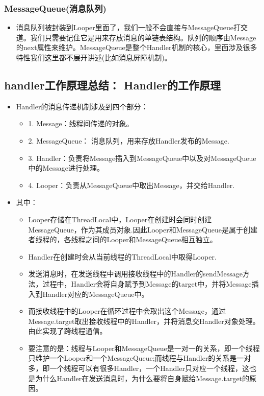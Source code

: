 \documentclass[9pt, b5paper]{article}
\begin{document}
\subsubsection{MessageQueue(消息队列)}
\label{sec-2-2-5}
\begin{itemize}
\item 消息队列被封装到Looper里面了，我们一般不会直接与MessageQueue打交道。我们只需要记住它是用来存放消息的单链表结构。队列的顺序由Message的next属性来维护。MessageQueue是整个Handler机制的核心，里面涉及很多特性我们这里都不展开讲述(比如消息屏障机制)。
\end{itemize}
\subsection{handler工作原理总结： Handler的工作原理}
\label{sec-2-3}
\begin{itemize}
\item Handler的消息传递机制涉及到四个部分：
\begin{itemize}
\item 1. Message：线程间传递的对象。
\item 2. MessageQueue： 消息队列，用来存放Handler发布的Message.
\item 3. Handler：负责将Message插入到MessageQueue中以及对MessageQueue中的Message进行处理。
\item 4. Looper：负责从MessageQueue中取出Message，并交给Handler.
\end{itemize}
\item 其中：
\begin{itemize}
\item Looper存储在ThreadLocal中，Looper在创建时会同时创建MessageQueue，作为其成员对象.因此Looper和MessageQueue是属于创建者线程的，各线程之间的Looper和MessageQueue相互独立。
\item Handler在创建时会从当前线程的ThreadLocal中取得Looper.
\item 发送消息时，在发送线程中调用接收线程中的Handler的sendMessage方法，过程中，Handler会将自身赋予到Message的target中，并将Message插入到Handler对应的MessageQueue中。
\item 而接收线程中的Looper在循环过程中会取出这个Message，通过Message.target取出接收线程中的Handler，并将消息交Handler对象处理。由此实现了跨线程通信。
\item 要注意的是：线程与Looper和MessageQueue是一对一的关系，即一个线程只维护一个Looper和一个MessageQueue;而线程与Handler的关系是一对多，即一个线程可以有很多Handler，一个Handler只对应一个线程，这也是为什么Handler在发送消息时，为什么要将自身赋给Message.target的原因。

\end{itemize}
\end{itemize}
\end{document}
